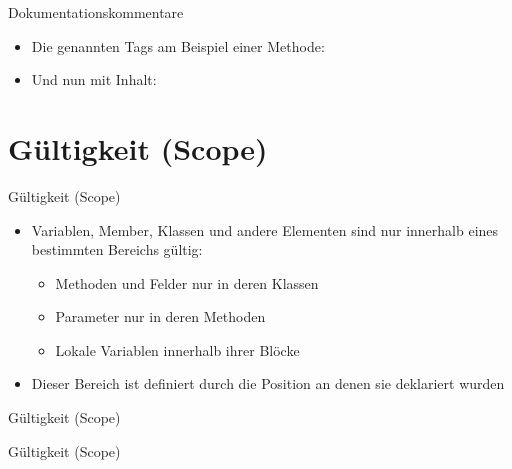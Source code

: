 \begin{frame}{Dokumentationskommentare}
	\begin{itemize}
		\item Die genannten Tags am Beispiel einer Methode:
	\end{itemize}
		
\end{frame}

\begin{frame}
	\begin{itemize}
		\item Und nun mit Inhalt:
	\end{itemize}
			
\end{frame}

\section{Gültigkeit (Scope)}
\begin{frame}{Gültigkeit (Scope)}
	\begin{itemize}
		\item Variablen, Member, Klassen und andere Elementen sind nur innerhalb eines bestimmten Bereichs gültig:
		\begin{itemize}
			\item Methoden und Felder nur in deren Klassen
			\item Parameter nur in deren Methoden
			\item Lokale Variablen innerhalb ihrer Blöcke
		\end{itemize}
		\item Dieser Bereich ist definiert durch die Position an denen sie deklariert wurden
	\end{itemize}
\end{frame}

\begin{frame}{Gültigkeit (Scope)}
	
\end{frame}

\begin{frame}{Gültigkeit (Scope)}
	
\end{frame}

